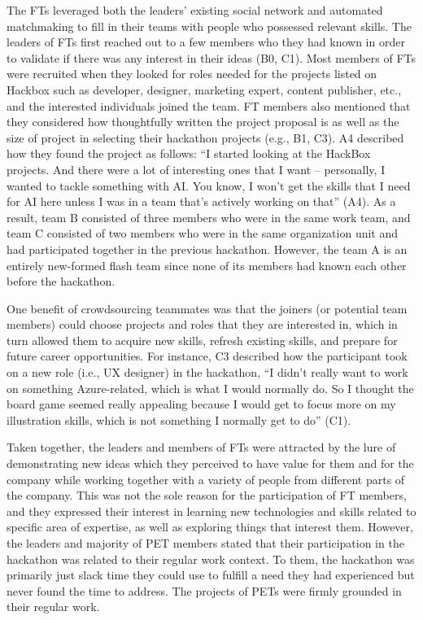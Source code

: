 \documentclass{hcij}
\begin{document}
The FTs leveraged both the leaders’ existing social network and automated matchmaking to fill in their teams with people who possessed relevant skills. The leaders of FTs first reached out to a few members who they had known in order to validate if there was any interest in their ideas (B0, C1). Most members of FTs were recruited when they looked for roles needed for the projects listed on Hackbox such as developer, designer, marketing expert, content publisher, etc., and the interested individuals joined the team. FT members also mentioned that they considered how thoughtfully written the project proposal is as well as the size of project in selecting their hackathon projects (e.g., B1, C3). A4 described how they found the project as follows: “I started looking at the HackBox projects. And there were a lot of interesting ones that I want – personally, I wanted to tackle something with AI. You know, I won't get the skills that I need for AI here unless I was in a team that's actively working on that” (A4). As a result, team B consisted of three members who were in the same work team, and team C consisted of two members who were in the same organization unit and had participated together in the previous hackathon. However, the team A is an entirely new-formed flash team since none of its members had known each other before the hackathon.

One benefit of crowdsourcing teammates was that the joiners (or potential team members) could choose projects and roles that they are interested in, which in turn allowed them to acquire new skills, refresh existing skills, and prepare for future career opportunities. For instance, C3 described how the participant took on a new role (i.e., UX designer) in the hackathon, “I didn't really want to work on something Azure-related, which is what I would normally do. So I thought the board game seemed really appealing because I would get to focus more on my illustration skills, which is not something I normally get to do” (C1).

Taken together, the leaders and members of FTs were attracted by the lure of demonstrating new ideas which they perceived to have value for them and for the company while working together with a variety of people from different parts of the company. This was not the sole reason for the participation of FT members, and they expressed their interest in learning new technologies and skills related to specific area of expertise, as well as exploring things that interest them. However, the leaders and majority of PET members stated that their participation in the hackathon was related to their regular work context. To them, the hackathon was primarily just slack time they could use to fulfill a need they had experienced but never found the time to address. The projects of PETs were firmly grounded in their regular work.
\end{document}
